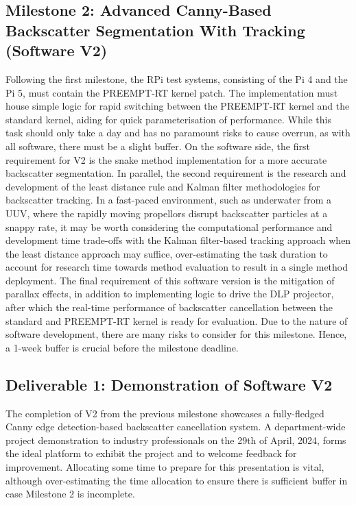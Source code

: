\subsection{Milestone 2: Advanced Canny-Based Backscatter Segmentation With Tracking (Software V2)}
Following the first milestone, the RPi test systems, consisting of the Pi 4 and the Pi 5, must contain the PREEMPT-RT kernel patch. The implementation must house simple logic for rapid switching between the PREEMPT-RT kernel and the standard kernel, aiding for quick parameterisation of performance. While this task should only take a day and has no paramount risks to cause overrun, as with all software, there must be a slight buffer. On the software side, the first requirement for V2 is the snake method implementation for a more accurate backscatter segmentation. In parallel, the second requirement is the research and development of the least distance rule and Kalman filter methodologies for backscatter tracking. In a fast-paced environment, such as underwater from a UUV, where the rapidly moving propellors disrupt backscatter particles at a snappy rate, it may be worth considering the computational performance and development time trade-offs with the Kalman filter-based tracking approach when the least distance approach may suffice, over-estimating the task duration to account for research time towards method evaluation to result in a single method deployment. The final requirement of this software version is the mitigation of parallax effects, in addition to implementing logic to drive the DLP projector, after which the real-time performance of backscatter cancellation between the standard and PREEMPT-RT kernel is ready for evaluation. Due to the nature of software development, there are many risks to consider for this milestone. Hence, a 1-week buffer is crucial before the milestone deadline.

\subsection{Deliverable 1: Demonstration of Software V2}
The completion of V2 from the previous milestone showcases a fully-fledged Canny edge detection-based backscatter cancellation system. A department-wide project demonstration to industry professionals on the 29th of April, 2024, forms the ideal platform to exhibit the project and to welcome feedback for improvement. Allocating some time to prepare for this presentation is vital, although over-estimating the time allocation to ensure there is sufficient buffer in case Milestone 2 is incomplete.

